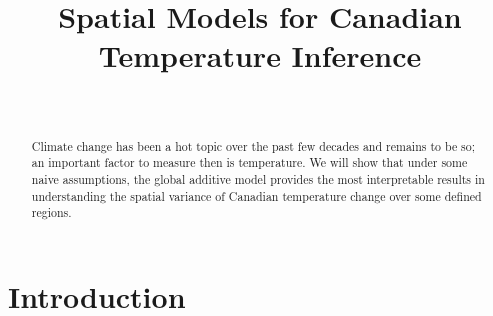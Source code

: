 \documentclass[aoas]{imsart}\usepackage[]{graphicx}\usepackage[]{xcolor}
\begin{document}

\begin{frontmatter}
\title{Spatial Models for Canadian Temperature Inference}

\begin{aug}

\author[A]{~}

\address[A]{Department of Statistics,
University of Waterloo}

\end{aug}

\begin{abstract}
Climate change has been a hot topic over the past few decades and remains to be so; an important factor to measure then is temperature. We will show that under some naive assumptions, the global additive model provides the most interpretable results in understanding the spatial variance of Canadian temperature change over some defined regions.
\end{abstract}

\end{frontmatter}

\section{Introduction}\hfill\\
\end{document}
